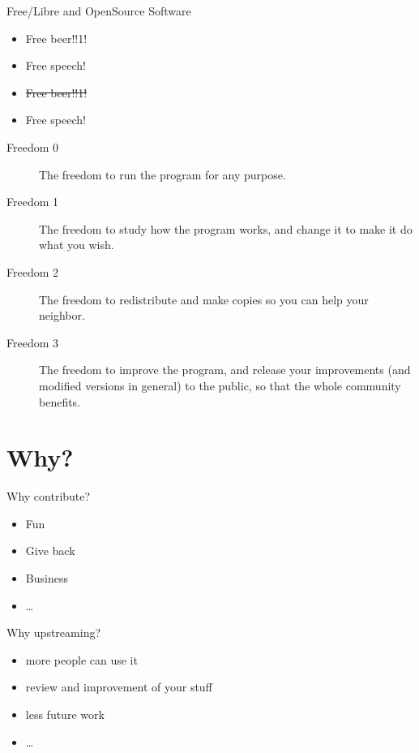 \documentclass{beamer}
\begin{document}
\begin{frame}{Free/Libre and OpenSource Software}
    {
        \begin{itemize}
            \item Free beer!!1!
            \item<2-> Free speech!
        \end{itemize}
    }

    {
        \begin{itemize}
            \item \sout{Free beer!!1!}
            \item Free speech!
        \end{itemize}
    }

    {
        \begin{description}
            \item[Freedom 0] The freedom to run the program for any purpose.
            \item[Freedom 1] The freedom to study how the program works, and
                change it to make it do what you wish.
            \item[Freedom 2] The freedom to redistribute and make copies so
                you can help your neighbor.
            \item[Freedom 3] The freedom to improve the program, and release
                your improvements (and modified versions in general) to the
                public, so that the whole community benefits.
        \end{description}
    }
\end{frame}

\section{Why?}

\begin{frame}{Why contribute?}
    \begin{itemize}
        \item Fun
        \item Give back
        \item Business
        \item \dots
    \end{itemize}
\end{frame}

\begin{frame}{Why upstreaming?}
    \begin{itemize}
        \item more people can use it
        \item review and improvement of your stuff
        \item less future work
        \item \dots
    \end{itemize}
\end{frame}
\end{document}
